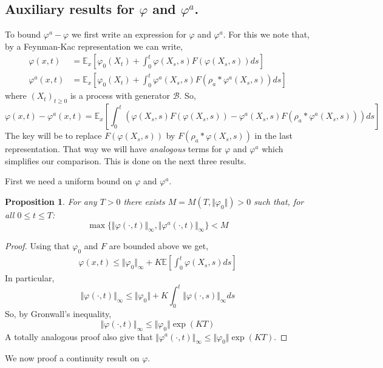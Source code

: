 \documentclass[a4paper,12pt]{article}
\newtheorem{proposition}[theorem]{Proposition}
\newcommand{\EE}{\mathbb{E}}
\newcommand{\DG}{\mathcal{B}}
\newcommand{\1}{{\bf {1}}}
\begin{document}
\subsection{Auxiliary results for $\varphi$ and $\varphi^a$.}
To bound $\varphi^a-\varphi$ we first write an expression for $\varphi$ and $\varphi^a$. For this we note that, by a Feynman-Kac representation we can write,
\begin{align}
\varphi(x,t) &= \EE_x[\varphi_0(X_t) + \int_0^t \varphi(X_s,s)F(\varphi(X_s,s)) ds] \label{FK:varphi} \\
\varphi^a(x,t) &= \EE_x[\varphi_0(X_t) + \int_0^t \varphi^a(X_s,s)F(\rho_a*\varphi^a(X_s,s)) ds]
\end{align}
where $(X_t)_{t \geq 0}$ is a process with generator $\DG$. So,
\begin{equation} \varphi(x,t) - \varphi^a(x,t) = \EE_x\left[ \int_0^t (\varphi(X_s,s)F(\varphi(X_s,s))-\varphi^a(X_s,s)F(\rho_a*\varphi^a(X_s,s))) ds \right] \label{FK:diferencesVarphis}\end{equation}
The key will be to replace $F(\varphi(X_s,s))$ by $F(\rho_a*\varphi(X_s,s))$ in the last representation. That way we will have \textit{analogous} terms for $\varphi$ and $\varphi^a$ which simplifies our comparison. This is done on the next three results.

First we need a uniform bound on $\varphi$ and $\varphi^a$.  
\begin{proposition} \label{BoundednessVarphis}
For any $T>0$ there exists $M = M(T, \Vert \varphi_0 \Vert) >0$ such that, for all $0 \leq t \leq T$:
\[ \max\{ \Vert \varphi(\cdot,t) \Vert_\infty, \Vert \varphi^a(\cdot,t) \Vert_\infty\} < M \]
\end{proposition}
\begin{proof}
Using that $\varphi_0$ and $F$ are bounded above  we get,
\begin{align*}
\varphi(x,t) \leq \Vert \varphi_0 \Vert_\infty + K \EE[\int_0^t \varphi(X_s,s) ds]
\end{align*}
In particular,
\[ \Vert \varphi(\cdot,t) \Vert_\infty \leq \Vert \varphi_0 \Vert +  K \int_0^t \Vert \varphi(\cdot,s) \Vert_\infty ds \]
So, by Gronwall's inequality,
\[ \Vert \varphi(\cdot,t) \Vert_\infty \leq \Vert \varphi_0 \Vert \exp\left( K T \right) \]
A totally analogous proof also give that $\Vert \varphi^a(\cdot,t) \Vert_{\infty} \leq \Vert \varphi_0 \Vert \exp\left( K T \right) $.
\end{proof}
We now proof a continuity result on $\varphi$.
\end{document}
